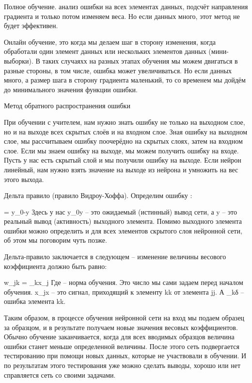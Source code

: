 \documentclass[12pt,a4paper]{report}
\begin{document}
Полное обучение. анализ ошибки на всех элементах данных, подсчёт направления градиента и только потом изменяем веса. Но если данных много, этот метод не будет эффективен.  

Онлайн обучение, это когда мы делаем шаг в сторону изменения, когда обработали один элемент данных или нескольких элементов данных (мини-выборки). В таких случаяхх на разных этапах обучения мы можем двигаться в разные стороны, в том числе, ошибка может увеличиваться. Но если данных много, а размер шага в сторону градиента маленький, то со временем мы дойдём до минимального значения функции ошибки. 

 Метод обратного распространения ошибки 

При обучении с учителем, нам нужно знать ошибку не только на выходном слое, но и на выходе всех скрытых слоёв и на входном слое. Зная ошибку на выходном слое, мы рассчитываем ошибку поочерёдно на скрытых слоях, затем на входном слое. Если мы знаем ошибку на выходе, мы можем получить ошибку на входе. Пусть у нас есть скрытый слой и мы получили ошибку на выходе. Если нейрон линейный, нам нужно взять значение на выходе из нейрона и умножить на вес этого выхода.  

Дельта правило (правило Видроу-Хоффа).
Определим ошибку :

\delta = y_0\medspace-\medspace y
Здесь у нас y_0y – это ожидаемый (истинный) вывод сети, а y – это реальный вывод (активность) выходного элемента. Помимо выходного элемента ошибки можно определить и для всех элементов скрытого слоя нейронной сети, об этом мы поговорим чуть позже.

Дельта-правило заключается в следующем – изменение величины весового коэффициента должно быть равно:

\Delta w_{jk} = \eta\medspace\delta_k\medspace x_j
Где  – норма обучения. Это число мы сами задаем перед началом обучения. x_jx – это сигнал, приходящий к элементу kk от элемента jj. А \delta_kδ – ошибка элемента kk.

Таким образом, в процессе обучения нейронной сети на вход мы подаем образец за образцом, и в результате получаем новые значения весовых коэффициентов. Обычно обучение заканчивается, когда для всех вводимых образцов величина ошибки станет меньше определенной величины. После этого сеть подвергается тестированию при помощи новых данных, которые не участвовали в обучении. И по результатам этого тестирования уже можно сделать выводы, хорошо или нет справляется сеть со своими задачами.
\end{document}
